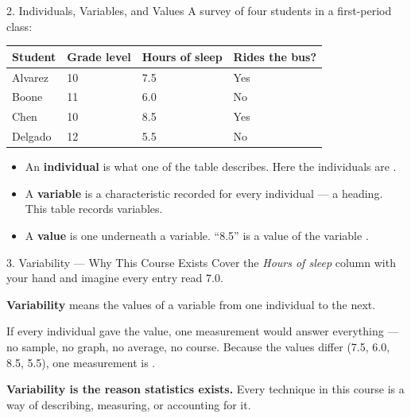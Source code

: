 \documentclass[10pt]{article}
\begin{document}
\boxguard[24]
\begin{notesbox}{2. Individuals, Variables, and Values}
\small
A survey of four students in a first-period class:

\vspace{5pt}
\renewcommand{\arraystretch}{1.25}
\begin{tabularx}{\linewidth}{@{} l Y Y Y @{}}
\textbf{Student} & \textbf{Grade level} & \textbf{Hours of sleep} & \textbf{Rides the bus?} \\
\hline
Alvarez & 10 & 7.5 & Yes \\
Boone   & 11 & 6.0 & No  \\
Chen    & 10 & 8.5 & Yes \\
Delgado & 12 & 5.5 & No  \\
\hline
\end{tabularx}

\vspace{8pt}
\begin{itemize}[leftmargin=1.3em, itemsep=6pt]
  \item An \textbf{individual} is what one  of the table describes. Here the
        individuals are .
  \item A \textbf{variable} is a characteristic recorded for every individual --- a
         heading. This table records  variables.
  \item A \textbf{value} is one  underneath a variable. ``8.5'' is a value
        of the variable .
\end{itemize}

\vspace{6pt}
\begin{center}
\end{center}
\end{notesbox}

\vspace{0.10in}

\boxguard[16]
\begin{notesbox}{3. Variability --- Why This Course Exists}
\small
Cover the \emph{Hours of sleep} column with your hand and imagine every entry read 7.0.

\vspace{6pt}
\textbf{Variability} means the values of a variable  from one individual to the
next.

\vspace{6pt}
If every individual gave the  value, one measurement would answer everything ---
no sample, no graph, no average, no course. Because the values differ (7.5, 6.0, 8.5, 5.5), one
measurement is .

\vspace{4pt}
\textbf{Variability is the reason statistics exists.} Every technique in this course is a way
of describing, measuring, or accounting for it.
\end{notesbox}
\end{document}
